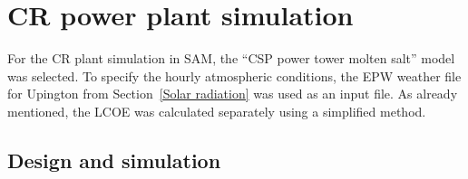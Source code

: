 \chapter{CR power plant simulation}
For the \ac{CR} plant simulation in \ac{SAM}, the \enquote{CSP power tower molten salt} model was selected. To specify the hourly atmospheric conditions, the EPW weather file for Upington from Section~\ref{Solar radiation} was used as an input file. As already mentioned, the \ac{LCOE} was calculated separately using a simplified method.

\section{Design and simulation} \label{CR power plant design  and simulation}


